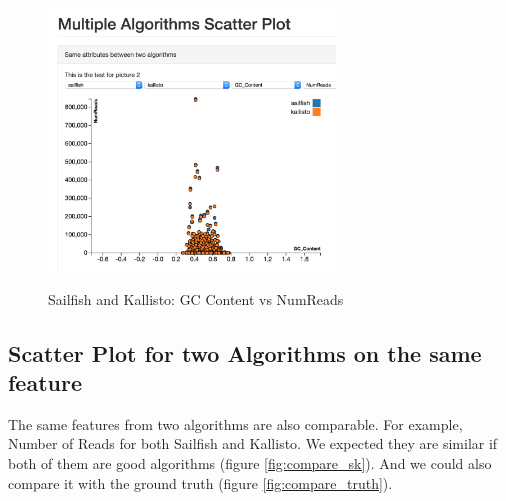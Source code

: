 \documentclass[11pt,letter]{article}
\begin{document}
\begin{figure}[h!]
\centering
\includegraphics[height=3in, width=3in]{./fig/two_algo.jpg}
\caption{Sailfish and Kallisto:  GC Content vs  NumReads}
\label{fig:two_algo}
\end{figure}

\subsection {Scatter Plot for two Algorithms on the same feature}
The same features from two algorithms are also comparable. For example, Number of Reads for both Sailfish and Kallisto. We expected they are similar if both of them are good algorithms (figure \ref{fig:compare_sk}). And we could also compare it with the ground truth (figure \ref{fig:compare_truth}).
\end{document}
